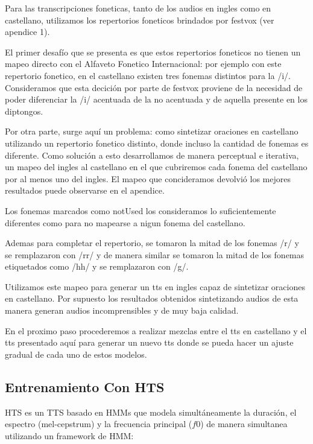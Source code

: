 
Para las transcripciones foneticas, tanto de los audios en ingles como en castellano, utilizamos los repertorios foneticos brindados por festvox (ver apendice 1).

El primer desafío que se presenta es que estos repertorios foneticos no tienen un mapeo directo con el Alfaveto Fonetico Internacional: por ejemplo con este repertorio fonetico, en el castellano existen tres fonemas distintos para la /i/. Consideramos que esta decición por parte de festvox proviene de la necesidad de poder diferenciar la /i/ acentuada de la no acentuada y de aquella presente en los diptongos. 

Por otra parte, surge aquí un problema: como sintetizar oraciones en castellano utilizando un repertorio fonetico distinto, donde incluso la cantidad de fonemas es diferente. Como solución a esto desarrollamos de manera perceptual e iterativa, un mapeo del ingles al castellano en el que cubriremos cada fonema del castellano por al menos uno del ingles. El mapeo que concideramos devolvió los mejores resultados puede observarse en el apendice.

Los fonemas marcados como notUsed los consideramos lo suficientemente diferentes como para no mapearse a nigun fonema del castellano.

Ademas para completar el repertorio, se tomaron la mitad de los fonemas /r/ y se remplazaron con /rr/ y de manera similar se tomaron la mitad de los fonemas etiquetados como /hh/ y se remplazaron con /g/.

Utilizamos este mapeo para generar un tts en ingles capaz de sintetizar oraciones en castellano. Por supuesto los resultados obtenidos sintetizando audios de esta manera generan audios incomprensibles y de muy baja calidad.

En el proximo paso procederemos a realizar mezclas entre el tts en castellano y el tts presentado aquí para generar un nuevo tts donde se pueda hacer un ajuste gradual de cada uno de estos modelos. 


\subsection{Entrenamiento Con HTS}

HTS es un TTS basado en HMMs que modela simultáneamente la duración, el espectro (mel-cepstrum) y la frecuencia principal ($f0$) de manera simultanea utilizando un framework de HMM:

